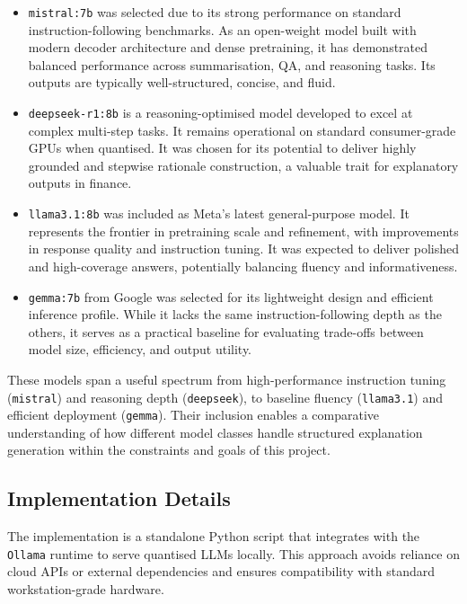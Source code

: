 \begin{itemize}
    \item \texttt{mistral:7b} was selected due to its strong performance on standard instruction-following benchmarks. As an open-weight model built with modern decoder architecture and dense pretraining, it has demonstrated balanced performance across summarisation, QA, and reasoning tasks. Its outputs are typically well-structured, concise, and fluid.
    
    \item \texttt{deepseek-r1:8b} is a reasoning-optimised model developed to excel at complex multi-step tasks. It remains operational on standard consumer-grade GPUs when quantised. It was chosen for its potential to deliver highly grounded and stepwise rationale construction, a valuable trait for explanatory outputs in finance.
    
    \item \texttt{llama3.1:8b} was included as Meta’s latest general-purpose model. It represents the frontier in pretraining scale and refinement, with improvements in response quality and instruction tuning. It was expected to deliver polished and high-coverage answers, potentially balancing fluency and informativeness.
    
    \item \texttt{gemma:7b} from Google was selected for its lightweight design and efficient inference profile. While it lacks the same instruction-following depth as the others, it serves as a practical baseline for evaluating trade-offs between model size, efficiency, and output utility.
\end{itemize}

These models span a useful spectrum from high-performance instruction tuning (\texttt{mistral}) and reasoning depth (\texttt{deepseek}), to baseline fluency (\texttt{llama3.1}) and efficient deployment (\texttt{gemma}). Their inclusion enables a comparative understanding of how different model classes handle structured explanation generation within the constraints and goals of this project.

\subsection{Implementation Details}

The implementation is a standalone Python script that integrates with the \texttt{Ollama} runtime to serve quantised LLMs locally. This approach avoids reliance on cloud APIs or external dependencies and ensures compatibility with standard workstation-grade hardware.

